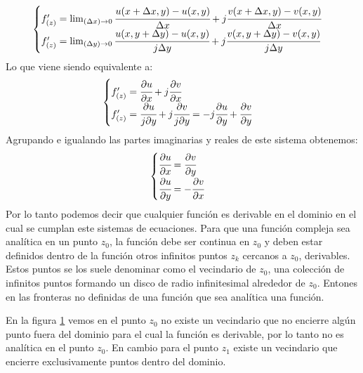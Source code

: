\begin{equation}
    \begin{cases}
        f'_{(z)}=\lim_{(\Delta x)\to 0}\cfrac{u(x+\Delta x,y)-u(x,y)}{\Delta x}+j\cfrac{v(x+\Delta x,y)-v(x,y)}{\Delta x}\\
        f'_{(z)}=\lim_{(\Delta y)\to 0}\cfrac{u(x,y+\Delta y)-u(x,y)}{j\Delta y}+j\cfrac{v(x,y+\Delta y)-v(x,y)}{j\Delta y}\\
    \end{cases}
\end{equation}
Lo que viene siendo equivalente a:
\begin{equation}
\begin{cases}
    f'_{(z)}=\cfrac{\partial u}{\partial x}+j\cfrac{\partial v}{\partial x}\\
    f'_{(z)}=\cfrac{\partial u}{j\partial y}+j\cfrac{\partial v}{j\partial y}=-j\cfrac{\partial u}{\partial y}+\cfrac{\partial v}{\partial y}
\end{cases}
\end{equation}
Agrupando e igualando las partes imaginarias y reales de este sistema obtenemos:
\begin{equation}
\begin{cases}
     \cfrac{\partial u}{\partial x}=\cfrac{\partial v}{\partial y}\\
     \cfrac{\partial u}{\partial y}=-\cfrac{\partial v}{\partial x}
     \label{eq:CauRei}
\end{cases}
\end{equation}
Por lo tanto podemos decir que cualquier función es derivable en el dominio en el cual se cumplan este sistemas de ecuaciones.
Para que una función compleja sea analítica en un punto $z_0$, la función debe ser continua en $z_0$ y deben estar definidos dentro de la función otros infinitos puntos $z_k$ cercanos a $z_0$, derivables. Estos puntos se los suele denominar como el vecindario de $z_0$, una colección de infinitos puntos formando un disco de radio infinitesimal alrededor de $z_0$. Entones en las fronteras no definidas de una función que sea analítica una función.
\begin{figure}[H]
    \centering
    
    \caption{}
    \label{fig:EjemDer}
\end{figure}
En la figura \ref{fig:EjemDer} vemos en el punto $z_0$  no existe un vecindario que no encierre algún punto fuera del dominio para el cual  la función es derivable, por lo tanto no es analítica en el punto $z_0$. En cambio para el punto $z_1$ existe un vecindario que encierre exclusivamente puntos dentro del dominio.

